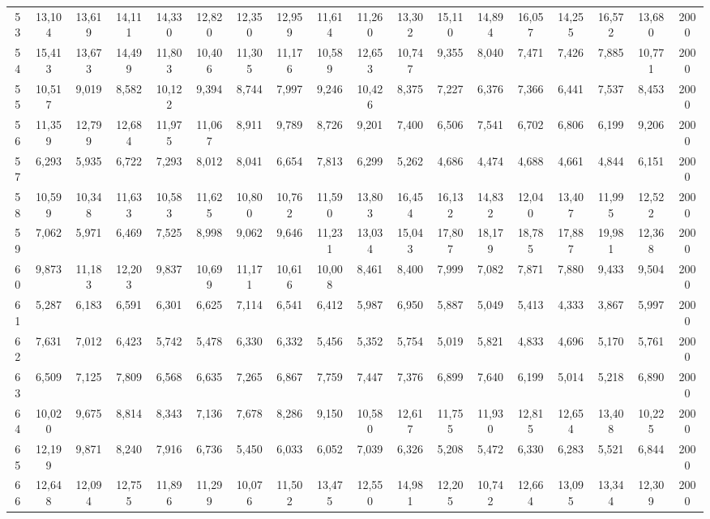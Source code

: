 {\begin{longtable}{ >{\tiny}cccccccccccccccccc}
53  & 13,104 & 13,619 & 14,111 & 14,330 & 12,820 & 12,350 & 12,959 & 11,614 & 11,260 & 13,302 & 15,110 & 14,894 & 16,057 & 14,255 & 16,572 & 13,680 & 2000 \\
54  & 15,413 & 13,673 & 14,499 & 11,803 & 10,406 & 11,305 & 11,176 & 10,589 & 12,653 & 10,747 & 9,355  & 8,040  & 7,471  & 7,426  & 7,885  & 10,771 & 2000 \\
55  & 10,517 & 9,019  & 8,582  & 10,122 & 9,394  & 8,744  & 7,997  & 9,246  & 10,426 & 8,375  & 7,227  & 6,376  & 7,366  & 6,441  & 7,537  & 8,453  & 2000 \\
56  & 11,359 & 12,799 & 12,684 & 11,975 & 11,067 & 8,911  & 9,789  & 8,726  & 9,201  & 7,400  & 6,506  & 7,541  & 6,702  & 6,806  & 6,199  & 9,206  & 2000 \\
57  & 6,293  & 5,935  & 6,722  & 7,293  & 8,012  & 8,041  & 6,654  & 7,813  & 6,299  & 5,262  & 4,686  & 4,474  & 4,688  & 4,661  & 4,844  & 6,151  & 2000 \\
58  & 10,599 & 10,348 & 11,633 & 10,583 & 11,625 & 10,800 & 10,762 & 11,590 & 13,803 & 16,454 & 16,132 & 14,832 & 12,040 & 13,407 & 11,995 & 12,522 & 2000 \\
59  & 7,062  & 5,971  & 6,469  & 7,525  & 8,998  & 9,062  & 9,646  & 11,231 & 13,034 & 15,043 & 17,807 & 18,179 & 18,785 & 17,887 & 19,981 & 12,368 & 2000 \\
60  & 9,873  & 11,183 & 12,203 & 9,837  & 10,699 & 11,171 & 10,616 & 10,008 & 8,461  & 8,400  & 7,999  & 7,082  & 7,871  & 7,880  & 9,433  & 9,504  & 2000 \\
61  & 5,287  & 6,183  & 6,591  & 6,301  & 6,625  & 7,114  & 6,541  & 6,412  & 5,987  & 6,950  & 5,887  & 5,049  & 5,413  & 4,333  & 3,867  & 5,997  & 2000 \\
62  & 7,631  & 7,012  & 6,423  & 5,742  & 5,478  & 6,330  & 6,332  & 5,456  & 5,352  & 5,754  & 5,019  & 5,821  & 4,833  & 4,696  & 5,170  & 5,761  & 2000 \\
63  & 6,509  & 7,125  & 7,809  & 6,568  & 6,635  & 7,265  & 6,867  & 7,759  & 7,447  & 7,376  & 6,899  & 7,640  & 6,199  & 5,014  & 5,218  & 6,890  & 2000 \\
64  & 10,020 & 9,675  & 8,814  & 8,343  & 7,136  & 7,678  & 8,286  & 9,150  & 10,580 & 12,617 & 11,755 & 11,930 & 12,815 & 12,654 & 13,408 & 10,225 & 2000 \\
65  & 12,199 & 9,871  & 8,240  & 7,916  & 6,736  & 5,450  & 6,033  & 6,052  & 7,039  & 6,326  & 5,208  & 5,472  & 6,330  & 6,283  & 5,521  & 6,844  & 2000 \\
66  & 12,648 & 12,094 & 12,755 & 11,896 & 11,299 & 10,076 & 11,502 & 13,475 & 12,550 & 14,981 & 12,205 & 10,742 & 12,664 & 13,095 & 13,344 & 12,309 & 2000 \\

\end{longtable}}
